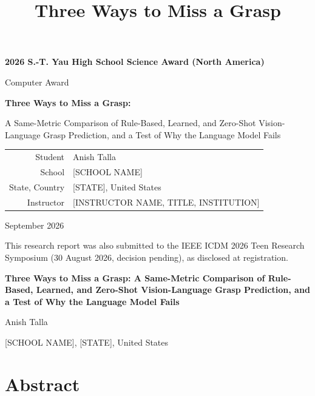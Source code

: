 \documentclass[12pt,letterpaper]{article}
\title{Three Ways to Miss a Grasp}
\begin{document}
\onehalfspacing

\begin{titlepage}
\centering
\vspace*{1.2in}
{\Large\bfseries 2026 S.-T. Yau High School Science Award (North America)\par}
\vspace{0.3in}
{\large Computer Award\par}
\vspace{1.0in}
{\LARGE\bfseries Three Ways to Miss a Grasp:\par}
\vspace{0.15in}
{\Large A Same-Metric Comparison of Rule-Based, Learned, and Zero-Shot
Vision-Language Grasp Prediction, and a Test of Why the Language Model Fails\par}
\vspace{1.2in}
{\large
\begin{tabular}{rl}
Student & Anish Talla \\
School & [SCHOOL NAME] \\
State, Country & [STATE], United States \\
Instructor & [INSTRUCTOR NAME, TITLE, INSTITUTION] \\
\end{tabular}\par}
\vspace{1.2in}
{\large September 2026\par}
\vfill
{\small This research report was also submitted to the IEEE ICDM 2026 Teen
Research Symposium (30 August 2026, decision pending), as disclosed at
registration.\par}
\end{titlepage}

\begin{center}
{\Large\bfseries Three Ways to Miss a Grasp: A Same-Metric Comparison of
Rule-Based, Learned, and Zero-Shot Vision-Language Grasp Prediction, and a
Test of Why the Language Model Fails\par}
\vspace{0.2in}
{\large Anish Talla\par}
{[SCHOOL NAME], [STATE], United States\par}
\end{center}
\vspace{0.2in}
\section*{Abstract}
\end{document}

